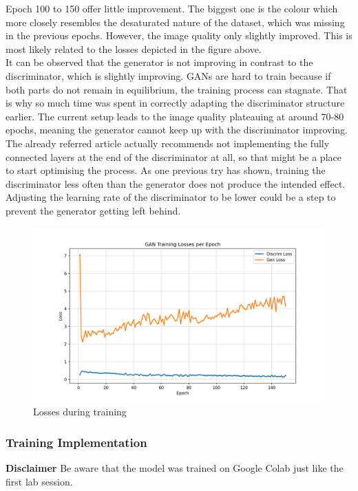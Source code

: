 Epoch 100 to 150 offer little improvement. The biggest one is the colour which more closely resembles the desaturated nature of the dataset, which was missing in the previous epochs. However, the image quality only slightly improved. This is most likely related to the losses depicted in the figure above. \\
It can be observed that the generator is not improving in contrast to the discriminator, which is slightly improving. GANs are hard to train because if both parts do not remain in equilibrium, the training process can stagnate. That is why so much time was spent in correctly adapting the discriminator structure earlier. The current setup leads to the image quality plateauing at around 70-80 epochs, meaning the generator cannot keep up with the discriminator improving. The already referred article \cite{brownlee_tips_2019} actually recommends not implementing the fully connected layers at the end of the discriminator at all, so that might be a place to start optimising the process. As one previous try has shown, training the discriminator less often than the generator does not produce the intended effect.  Adjusting the learning rate of the discriminator to be lower could be a step to prevent the generator getting left behind. 

\begin{figure}[t]
        \centering
        \includegraphics[width=\textwidth]{images/ex_2/try_2/training_losses_epoch}
        \caption{Losses during training}
    \end{figure}

\subsubsection{Training Implementation}
\textbf{Disclaimer}
Be aware that the model was trained on Google Colab just like the first lab session.





















 